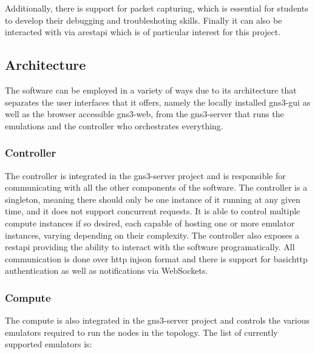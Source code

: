   Additionally, there is support for packet capturing, which is essential for students to develop their debugging and 
  troubleshoting skills. Finally it can also be interacted with via a\ac{rest}\ac{api} which is of particular interest
  for this project.

  \subsection{Architecture}
    The software can be employed in a variety of ways due to its architecture \cite{GNS3Architecture} that separates the user 
    interfaces that it offers, namely the locally installed gns3-gui as well as the browser accessible gns3-web, from the 
    gns3-server that runs the emulations and the controller who orchestrates everything.

    \subsubsection{Controller}
      The controller is integrated in the gns3-server project and is responsible for communicating with all the other components 
      of the software. The controller is a singleton, meaning there should only be one instance of it running at any given time, 
      and it does not support concurrent requests. It is able to control multiple compute instances if so desired, each capable 
      of hosting one or more emulator instances, varying depending on their complexity. The controller also exposes a
      \ac{rest}\ac{api} providing the ability to interact with the software programatically. All communication is done over
      \ac{http} in\ac{json} format and there is support for basic\ac{http} authentication as well as notifications via WebSockets.

    \subsubsection{Compute}
      The compute is also integrated in the gns3-server project and controls the various emulators required to run the nodes 
      in the topology.
      The list of currently supported emulators is:


